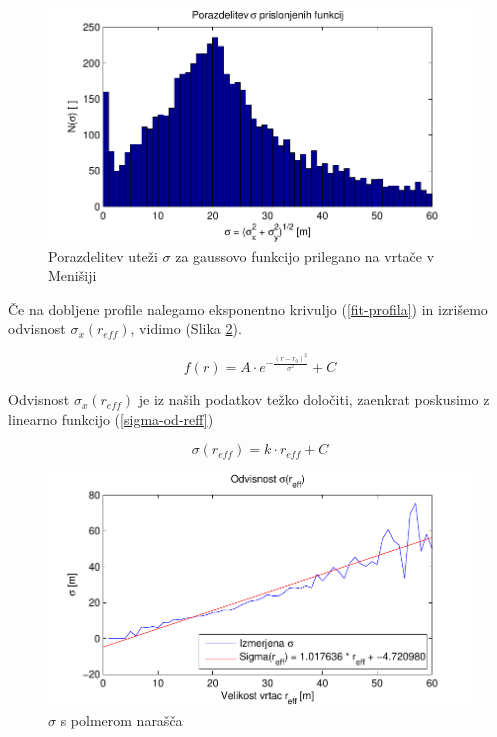 \documentclass[a4paper, oneside, 12pt]{book}
\begin{document}
        \begin{figure}[H]
          \begin{center}
            \includegraphics{slike/menisija-sigme-hist}
          \end{center}
          \caption{Porazdelitev uteži $\sigma$ za gaussovo funkcijo prilegano na vrtače v Menišiji}
          \label{fig:menisija-sigme-hist}
        \end{figure}

        Če na dobljene profile nalegamo eksponentno krivuljo (\ref{fit-profila}) in izrišemo odvisnost $\sigma_x (r_{eff})$, vidimo (Slika \ref{fig:menisija-sigma}).

        \begin{equation}
          f(r) = A \cdot e^{-\frac{(r-r_0)^2}{\sigma^2}} + C  
          \label{fit-profila}
        \end{equation}

        Odvisnost $\sigma_x(r_{eff})$ je iz naših podatkov težko določiti, zaenkrat poskusimo z linearno funkcijo (\ref{sigma-od-reff})

        \begin{equation}
          \sigma (r_{eff}) = k \cdot r_{eff} + C
          \label{sigma-od-reff}
        \end{equation}

        \begin{figure}[H]
          \centering
          \includegraphics{slike/menisija-sigme}
          \caption{$\sigma$ s polmerom narašča}
          \label{fig:menisija-sigma}
        \end{figure}
\end{document}
